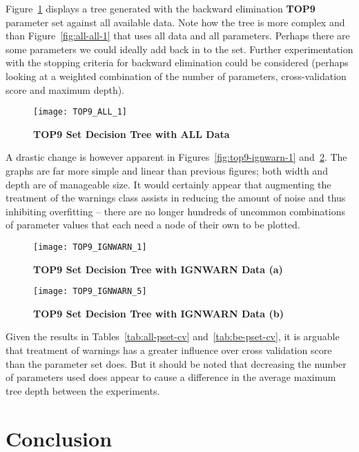 Figure~\ref{fig:top9-all-1} displays a tree generated with the backward
elimination \textbf{TOP9} parameter set against all available data. Note how the
tree is more complex and than Figure~\ref{fig:all-all-1} that uses all data and
all parameters. Perhaps there are some parameters we could ideally add back in
to the set. Further experimentation with the stopping criteria for backward
elimination could be considered (perhaps looking at a weighted combination
of the number of parameters, cross-validation score and maximum depth).

\begin{figure}[htbp!]
    \centering
    \texttt{[image: TOP9\_ALL\_1]}
    \caption[top9-all-1]{\textbf{TOP9 Set Decision Tree with ALL Data}}
    \label{fig:top9-all-1}
\end{figure}


A drastic change is however apparent in Figures~\ref{fig:top9-ignwarn-1}
and~\ref{fig:top9-ignwarn-2}. The graphs are far more simple and linear than
previous figures; both width and depth are of manageable size. It would
certainly appear that augmenting the treatment of the warnings class assists in
reducing the amount of noise and thus inhibiting overfitting -- there are no
longer hundreds of uncommon combinations of parameter values that each need a
node of their own to be plotted.


\begin{figure}[htbp!]
    \centering
    \texttt{[image: TOP9\_IGNWARN\_1]}
    \caption[top9-ignwarn-1]{\textbf{TOP9 Set Decision Tree with IGNWARN Data
    (a)}}
    \label{fig:top9-ignwarn-1}

    \vspace{10mm}

    \texttt{[image: TOP9\_IGNWARN\_5]}
    \caption[top9-ignwarn-2]{\textbf{TOP9 Set Decision Tree with IGNWARN Data
    (b)}}
    \label{fig:top9-ignwarn-2}
\end{figure}


Given the results in Tables~\ref{tab:all-pset-cv} and~\ref{tab:be-pset-cv}, it
is arguable that treatment of warnings has a greater influence over cross
validation score than the parameter set does. But it should be noted that
decreasing the number of parameters used does appear to cause a difference in
the average maximum tree depth between the experiments.


\section{Conclusion}

